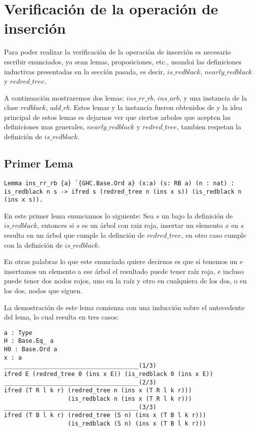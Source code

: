 \section{Verificación de la operación de inserción}

Para poder realizar la verificaci\'on de la operaci\'on de inserci\'on es necesario escribir
enunciados, ya sean lemas, proposiciones, etc., usandoi las definiciones inductivas presentadas en
la secci\'on pasada, es decir, $is\_redblack$, $nearly\_redblack$ y $redred\_tree$.

A continuaci\'on mostraremos dos lemas: $ins\_rr\_rb$, $ins\_arb$, y una instancia\cite{classes}
de la clase $redblack$, $add\_rb$. Estos lemas y la instancia fueron obtenidos de \cite{MSetRBT} y
la idea principal de estos lemas es dejarnos ver que ciertos arboles que acepten las definiciones
mas generales, $nearly\_redblack$ y $redred\_tree$, tambien respetan la definici\'on de
$is\_redblack$.

\subsection{Primer Lema}

\begin{verbatim}
Lemma ins_rr_rb {a} `{GHC.Base.Ord a} (x:a) (s: RB a) (n : nat) :
is_redblack n s -> ifred s (redred_tree n (ins x s)) (is_redblack n (ins x s)).
\end{verbatim}
En este primer lema enunciamos lo siguiente: Sea $s$ un {\arn} bajo la definici\'on de
$is\_redblack$, entonces si $s$ es un \'arbol con raiz roja, insertar un elemento $x$ en $s$
resulta en un \'arbol que cumple la definci\'on de $redred\_tree$, en otro caso cumple con la
definici\'on de $is\_redblack$.

En otras palabras lo que este enunciado quiere decirnos es que si tenemos un {\arn} e insertamos
un elemento a ese \'arbol el resultado puede tener ra\'iz roja, e incluso puede tener dos nodos
rojos, uno en la ra\'iz y otro en cualquiera de los dos, o en los dos, nodos que siguen.

La demostraci\'on de este lema comienza con una inducci\'on sobre el antecedente del lema, lo cual
resulta en tres casos:

 \begin{verbatim}
a : Type
H : Base.Eq_ a
H0 : Base.Ord a
x : a
______________________________________(1/3)
ifred E (redred_tree 0 (ins x E)) (is_redblack 0 (ins x E))
______________________________________(2/3)
ifred (T R l k r) (redred_tree n (ins x (T R l k r)))
                  (is_redblack n (ins x (T R l k r)))
______________________________________(3/3)
ifred (T B l k r) (redred_tree (S n) (ins x (T B l k r)))
                  (is_redblack (S n) (ins x (T B l k r)))
 \end{verbatim}

